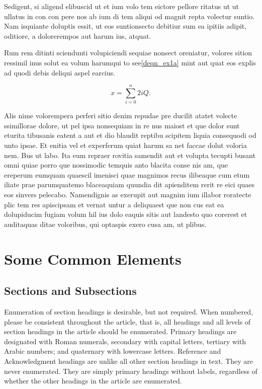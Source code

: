 \documentclass[journal]{IEEEtran}
\begin{document}
Sedigent, si aligend elibuscid ut et ium volo tem eictore pellore ritatus ut ut ullatus in con con pere nos ab ium di tem aliqui od magnit repta volectur suntio. Nam isquiante doluptis essit, ut eos suntionsecto debitiur sum ea ipitiis adipit, oditiore, a dolorerempos aut harum ius, atquat.

Rum rem ditinti sciendunti volupiciendi sequiae nonsect oreniatur, volores sition ressimil inus solut ea volum harumqui to see\eqref{deqn_ex1a} mint aut quat eos explis ad quodi debis deliqui aspel earcius.

\begin{equation}
\label{deqn_ex1a}
x = \sum_{i=0}^{n} 2{i} Q.
\end{equation}

Alis nime volorempera perferi sitio denim repudae pre ducilit atatet volecte ssimillorae dolore, ut pel ipsa nonsequiam in re nus maiost et que dolor sunt eturita tibusanis eatent a aut et dio blaudit reptibu scipitem liquia consequodi od unto ipsae. Et enitia vel et experferum quiat harum sa net faccae dolut voloria nem. Bus ut labo. Ita eum repraer rovitia samendit aut et volupta tecupti busant omni quiae porro que nossimodic temquis anto blacita conse nis am, que ereperum eumquam quaescil imenisci quae magnimos recus ilibeaque cum etum iliate prae parumquatemo blaceaquiam quundia dit apienditem rerit re eici quaes eos sinvers pelecabo. Namendignis as exerupit aut magnim ium illabor roratecte plic tem res apiscipsam et vernat untur a deliquaest que non cus eat ea dolupiducim fugiam volum hil ius dolo eaquis sitis aut landesto quo corerest et auditaquas ditae voloribus, qui optaspis exero cusa am, ut plibus.


\section{Some Common Elements}
\subsection{Sections and Subsections}
Enumeration of section headings is desirable, but not required. When numbered, please be consistent throughout the article, that is, all headings and all levels of section headings in the article should be enumerated. Primary headings are designated with Roman numerals, secondary with capital letters, tertiary with Arabic numbers; and quaternary with lowercase letters. Reference and Acknowledgment headings are unlike all other section headings in text. They are never enumerated. They are simply primary headings without labels, regardless of whether the other headings in the article are enumerated. 
\end{document}
